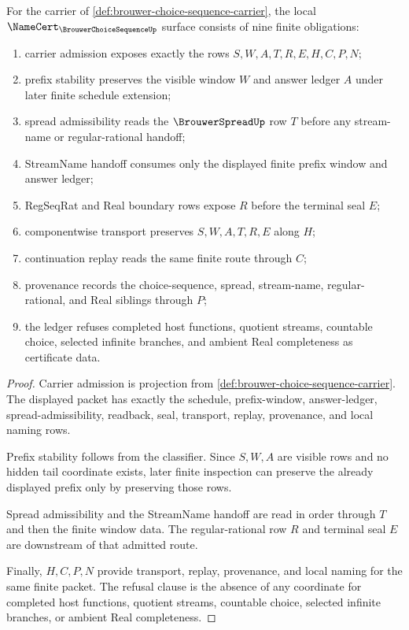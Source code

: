 \begin{theorem}
\label{thm:brouwer-choice-sequence-namecert-obligations}
For the carrier of \autoref{def:brouwer-choice-sequence-carrier}, the local $\NameCert_{\BrouwerChoiceSequenceUp}$ surface consists of nine finite obligations:
\begin{enumerate}
\item carrier admission exposes exactly the rows $S,W,A,T,R,E,H,C,P,N$;
\item prefix stability preserves the visible window $W$ and answer ledger $A$ under later finite schedule extension;
\item spread admissibility reads the $\BrouwerSpreadUp$ row $T$ before any stream-name or regular-rational handoff;
\item StreamName handoff consumes only the displayed finite prefix window and answer ledger;
\item RegSeqRat and Real boundary rows expose $R$ before the terminal seal $E$;
\item componentwise transport preserves $S,W,A,T,R,E$ along $H$;
\item continuation replay reads the same finite route through $C$;
\item provenance records the choice-sequence, spread, stream-name, regular-rational, and Real siblings through $P$;
\item the ledger refuses completed host functions, quotient streams, countable choice, selected infinite branches, and ambient Real completeness as certificate data.
\end{enumerate}
\end{theorem}
\begin{proof}
Carrier admission is projection from \autoref{def:brouwer-choice-sequence-carrier}. The displayed packet has exactly the schedule, prefix-window, answer-ledger, spread-admissibility, readback, seal, transport, replay, provenance, and local naming rows.

Prefix stability follows from the classifier. Since $S,W,A$ are visible rows and no hidden tail coordinate exists, later finite inspection can preserve the already displayed prefix only by preserving those rows.

Spread admissibility and the StreamName handoff are read in order through $T$ and then the finite window data. The regular-rational row $R$ and terminal seal $E$ are downstream of that admitted route.

Finally, $H,C,P,N$ provide transport, replay, provenance, and local naming for the same finite packet. The refusal clause is the absence of any coordinate for completed host functions, quotient streams, countable choice, selected infinite branches, or ambient Real completeness.
\end{proof}

